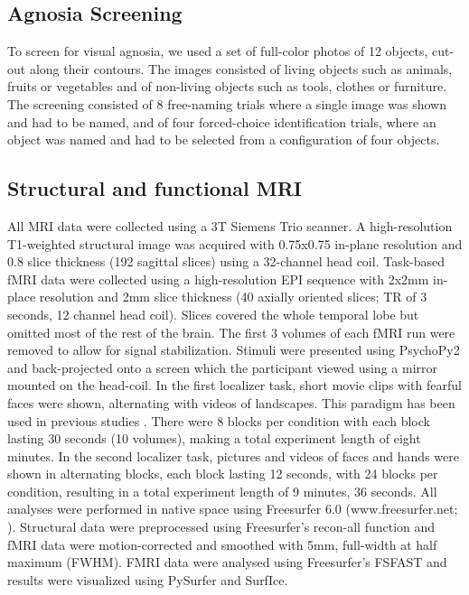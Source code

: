 \documentclass[fleqn,10pt]{SelfArx} %
\begin{document}
\subsection*{Agnosia Screening}
To screen for visual agnosia, we used a set of full-color photos of 12 objects, cut-out along their contours. The images consisted of living objects such as animals, fruits or vegetables and of non-living objects such as tools, clothes or furniture. The screening consisted of 8 free-naming trials where a single image was shown and had to be named, and of four forced-choice identification trials, where an object was named and had to be selected from a configuration of four objects. 

\subsection*{Structural and functional MRI}
All MRI data were collected using a 3T Siemens Trio scanner. A high-resolution T1-weighted structural image was acquired with 0.75x0.75 in-plane resolution and 0.8 slice thickness (192 sagittal slices) using a 32-channel head coil. Task-based fMRI data were collected using a high-resolution EPI sequence with 2x2mm in-place resolution and 2mm slice thickness (40 axially oriented slices; TR of 3 seconds, 12 channel head coil). Slices covered the whole temporal lobe but omitted most of the rest of the brain. The first 3 volumes of each fMRI run were removed to allow for signal stabilization. Stimuli were presented using PsychoPy2 \citep{Peirce_2007} and back-projected onto a screen which the participant viewed using a mirror mounted on the head-coil. In the first localizer task, short movie clips with fearful faces were shown, alternating with videos of landscapes. This paradigm has been used in previous studies \citep{Schacher_2006, Labudda_2014}. There were 8 blocks per condition with each block lasting 30 seconds (10 volumes), making a total experiment length of eight minutes. In the second localizer task, pictures and videos of faces and hands were shown in alternating blocks, each block lasting 12 seconds, with 24 blocks per condition, resulting in a total experiment length of 9 minutes, 36 seconds. All analyses were performed in native space using Freesurfer 6.0 (www.freesurfer.net; \citet{Dale_1999}). Structural data were preprocessed using Freesurfer's recon-all function and fMRI data were motion-corrected and smoothed with 5mm, full-width at half maximum (FWHM). FMRI data were analysed using Freesurfer's FSFAST and results were visualized using PySurfer and SurfIce.
\end{document}
